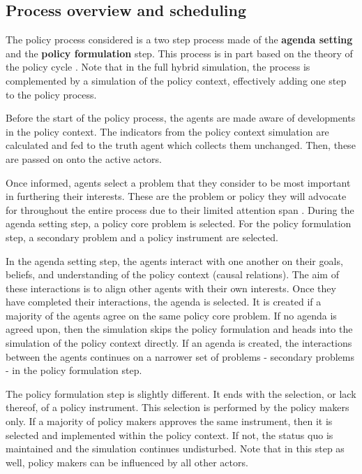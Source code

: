 \subsection{Process overview and scheduling}
\label{ssec:process}

The policy process considered is a two step process made of the {\bfseries agenda setting} and the {\bfseries policy formulation} step. This process is in part based on the theory of the policy cycle \citep{simmons1974policy}. Note that in the full hybrid simulation, the process is complemented by a simulation of the policy context, effectively adding one step to the policy process.

Before the start of the policy process, the agents are made aware of developments in the policy context. The indicators from the policy context simulation are calculated and fed to the truth agent which collects them unchanged. Then, these are passed on onto the active actors.

Once informed, agents select a problem that they consider to be most important in furthering their interests. These are the problem or policy they will advocate for throughout the entire process due to their limited attention span \citep{baumgartner2014punctuated}. During the agenda setting step, a policy core problem is selected. For the policy formulation step, a secondary problem and a policy instrument are selected.

In the agenda setting step, the agents interact with one another on their goals, beliefs, and understanding of the policy context (causal relations). The aim of these interactions is to align other agents with their own interests. Once they have completed their interactions, the agenda is selected. It is created if a majority of the agents agree on the same policy core problem. If no agenda is agreed upon, then the simulation skips the policy formulation and heads into the simulation of the policy context directly. If an agenda is created, the interactions between the agents continues on a narrower set of problems - secondary problems - in the policy formulation step.

The policy formulation step is slightly different. It ends with the selection, or lack thereof, of a policy instrument. This selection is performed by the policy makers only. If a majority of policy makers approves the same instrument, then it is selected and implemented within the policy context. If not, the status quo is maintained and the simulation continues undisturbed. Note that in this step as well, policy makers can be influenced by all other actors.

